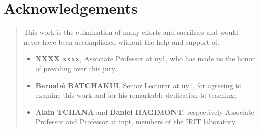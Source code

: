 %
%
%
%
%
%
\chapter*{Acknowledgements}
\begin{SingleSpace}
\begin{quote}
This work is the culmination of many efforts and sacrifices and would never have been accomplished without the help and support of:

\begin{itemize}
	\item \textbf{XXXX xxxx}, Associate Professor at \acrshort{uy1}, who has made us the honor of presiding over this jury;
    \item \textbf{Bernab\'{e} BATCHAKUI}, Senior Lecturer at \acrshort{uy1}, for agreeing to examine this work and for his remarkable dedication to teaching;
    \item \textbf{Alain TCHANA} and \textbf{Daniel HAGIMONT}, respectively Associate Professor and Professor at \acrshort{inpt}, members of the IRIT laboratory 

    
\end{itemize}

\end{quote}
\end{SingleSpace}
\clearpage
